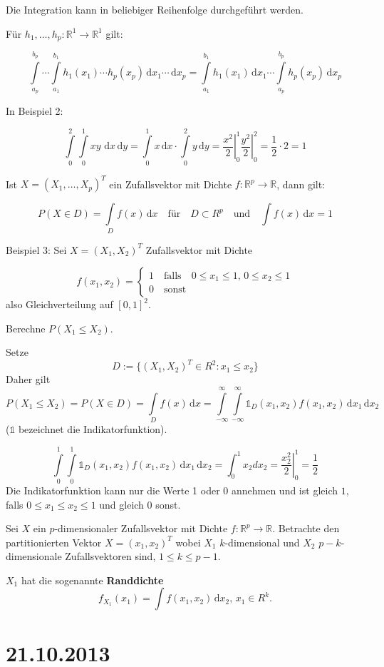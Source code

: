 \documentclass[12pt, a4paper]{article}
\theoremstyle{empty}
\newcommand{\R}{\mathbb{R}}
\newcommand{\1}{\mathds{1}}
\renewcommand{\d}{\,\mathrm{d}}
\providecommand{\mtext}[1]{\quad \text{#1} \quad}
\providecommand{\eval}[1]{\left. #1 \right|}
\begin{document}
Die Integration kann in beliebiger Reihenfolge durchgeführt werden.

Für $ h_1, \ldots, h_p: \R^1 \to \R^1 $ gilt:

\[ \int\limits_{a_p}^{b_p} \cdots \int\limits_{a_1}^{b_1}   h_1(x_1) \cdots h_p(x_p) \d x_1 \cdots \d x_p = \int\limits_{a_1}^{b_1} h_1(x_1) \d x_1 \cdots \int\limits_{a_p}^{b_p} h_p(x_p) \d x_p \]

In Beispiel 2:

\[ \int\limits_0^2 \int\limits_0^1 x y\, \d x \d y =  \int\limits_0^1 x  \d x \cdot \int\limits_0^2 y \d y = \eval{\frac{x^2}{2}}_0^1 \eval{\frac{y^2}{2}}_0^2  = \frac{1}{2} \cdot 2 = 1 \]

Ist $X = (X_1, \ldots, X_p)^T $ ein Zufallsvektor mit Dichte $f: \R^p \to \R$, dann gilt:

\[ P(X \in D) = \int\limits_D f(x) \d x \mtext{für} D \subset R^p \mtext{und} \int f(x) \d x = 1 \]

Beispiel 3: Sei $X = (X_1, X_2)^T$ Zufallsvektor mit Dichte

\[
f(x_1, x_2) = \begin{cases}
1 \mtext{falls} 0 \leq x_1 \leq 1, \, 0 \leq x_2 \leq 1 \\ 0 \mtext{sonst} \end{cases}\] also Gleichverteilung auf $[0,1]^2$.

Berechne $P(X_1 \leq X_2)$.

Setze 
\[D := \{ (X_1, X_2)^T \in R^2: x_1 \leq x_2 \}\] Daher gilt 
\[ P(X_1 \leq X_2) = P(X \in D) = \int\limits_D f(x) \d x = \int\limits_{-\infty}^{\infty} \int\limits_{-\infty}^{\infty}  \1_D (x_1, x_2) f(x_1, x_2) \d x_1 \d x_2\] ($\1$ bezeichnet die Indikatorfunktion).

\[ \int\limits_0^1 \int\limits_0^1 \1_D (x_1, x_2) f(x_1, x_2) \d x_1 \d x_2 = \int_0^1 x_2 dx_2 = \eval{\frac{x_2^2}{2}}_0^1 = \frac{1}{2} \] Die Indikatorfunktion kann nur die Werte 1 oder 0 annehmen und ist gleich $1$, falls $0 \leq x_1 \leq x_2 \leq 1$ und gleich $0$ sonst.

Sei $ X $ ein $p$-dimensionaler Zufallsvektor mit Dichte $ f:\R^p \to \R  $. Betrachte den partitionierten Vektor $ X= (x_1, x_2)^T $ wobei $X_1$ $k$-dimensional und $X_2$ $p-k$-dimensionale Zufallsvektoren sind, $1 \leq k \leq p-1$.

$X_1$ hat die sogenannte \textbf{Randdichte} \[f_{X_1}(x_1) = \int f(x_1, x_2) \d x_2,\, x_1 \in R^k . \]

\section{21.10.2013}
\end{document}
